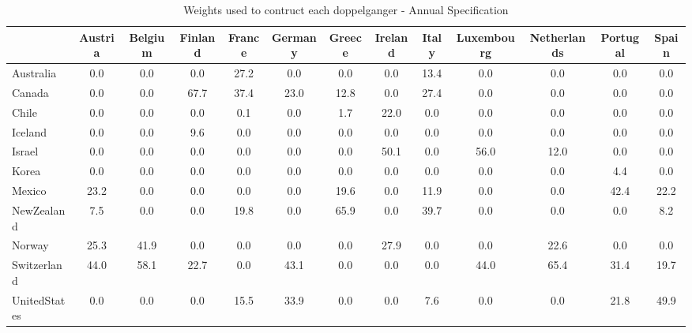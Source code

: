 \begin{table}[htbp]
\caption{\label{clabel} Weights used to contruct each doppelganger - Annual Specification}\centering\medskip
\begin{tabular}{lcccccccccccc} \hline \hline
 & Austria  & Belgium  & Finland  & France  & Germany  & Greece  & Ireland  & Italy  & Luxembourg  & Netherlands  & Portugal  & Spain  \\  \hline 
Australia &       0.0 &       0.0 &       0.0 &      27.2 &       0.0 &       0.0 &       0.0 &      13.4 &       0.0 &       0.0 &       0.0 &       0.0 \\  
Canada &       0.0 &       0.0 &      67.7 &      37.4 &      23.0 &      12.8 &       0.0 &      27.4 &       0.0 &       0.0 &       0.0 &       0.0 \\  
Chile &       0.0 &       0.0 &       0.0 &       0.1 &       0.0 &       1.7 &      22.0 &       0.0 &       0.0 &       0.0 &       0.0 &       0.0 \\  
Iceland &       0.0 &       0.0 &       9.6 &       0.0 &       0.0 &       0.0 &       0.0 &       0.0 &       0.0 &       0.0 &       0.0 &       0.0 \\  
Israel &       0.0 &       0.0 &       0.0 &       0.0 &       0.0 &       0.0 &      50.1 &       0.0 &      56.0 &      12.0 &       0.0 &       0.0 \\  
Korea &       0.0 &       0.0 &       0.0 &       0.0 &       0.0 &       0.0 &       0.0 &       0.0 &       0.0 &       0.0 &       4.4 &       0.0 \\  
Mexico &      23.2 &       0.0 &       0.0 &       0.0 &       0.0 &      19.6 &       0.0 &      11.9 &       0.0 &       0.0 &      42.4 &      22.2 \\  
NewZealand &       7.5 &       0.0 &       0.0 &      19.8 &       0.0 &      65.9 &       0.0 &      39.7 &       0.0 &       0.0 &       0.0 &       8.2 \\  
Norway &      25.3 &      41.9 &       0.0 &       0.0 &       0.0 &       0.0 &      27.9 &       0.0 &       0.0 &      22.6 &       0.0 &       0.0 \\  
Switzerland &      44.0 &      58.1 &      22.7 &       0.0 &      43.1 &       0.0 &       0.0 &       0.0 &      44.0 &      65.4 &      31.4 &      19.7 \\  
UnitedStates &       0.0 &       0.0 &       0.0 &      15.5 &      33.9 &       0.0 &       0.0 &       7.6 &       0.0 &       0.0 &      21.8 &      49.9 \\  
\hline \hline \end{tabular}
\end{table}
